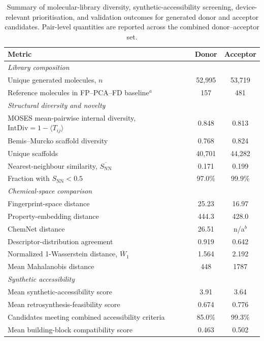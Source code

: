 \documentclass[12pt]{article}
\begin{document}
\begin{table}[!htb]
\centering
\caption{Summary of molecular-library diversity, synthetic-accessibility screening, device-relevant prioritisation, and validation outcomes for generated donor and acceptor candidates. Pair-level quantities are reported across the combined donor--acceptor set.}
\label{tab:consolidated_metrics}
\scriptsize
\setlength{\tabcolsep}{3pt}
\begin{tabular}{lcc}
\hline
\textbf{Metric} & \textbf{Donor} & \textbf{Acceptor} \\
\hline
\multicolumn{3}{l}{\textit{Library composition}} \\
Unique generated molecules, $n$ & 52{,}995 & 53{,}719 \\
Reference molecules in FP--PCA--FD baseline$^{a}$ & 157 & 481 \\
\hline
\multicolumn{3}{l}{\textit{Structural diversity and novelty}} \\
MOSES mean-pairwise internal diversity, $\mathrm{IntDiv} = 1-\langle T_{ij}\rangle$ & 0.848 & 0.813 \\
Bemis--Murcko scaffold diversity & 0.768 & 0.824 \\
Unique scaffolds & 40{,}701 & 44{,}282 \\
Nearest-neighbour similarity, $\overline{S_{\mathrm{NN}}}$ & 0.171 & 0.199 \\
Fraction with $S_{\mathrm{NN}} < 0.5$ & 97.0\% & 99.9\% \\
\hline
\multicolumn{3}{l}{\textit{Chemical-space comparison}} \\
Fingerprint-space distance & 25.23 & 16.97 \\
Property-embedding distance & 444.3 & 428.0 \\
ChemNet distance & 26.51 & n/a$^{b}$ \\
Descriptor-distribution agreement & 0.919 & 0.642 \\
Normalized 1-Wasserstein distance, $\overline{W}_1$ & 1.564 & 2.192 \\
Mean Mahalanobis distance & 448 & 1787 \\
\hline
\multicolumn{3}{l}{\textit{Synthetic accessibility}} \\
Mean synthetic-accessibility score & 3.91 & 3.64 \\
Mean retrosynthesis-feasibility score & 0.674 & 0.776 \\
Candidates meeting combined accessibility criteria & 85.0\% & 99.3\% \\
Mean building-block compatibility score & 0.463 & 0.502 \\

\end{tabular}
\end{table}
\end{document}
